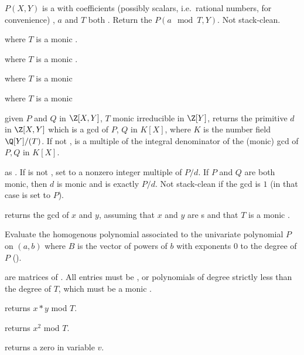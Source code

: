  $P(X,Y)$ is a  with
 coefficients (possibly scalars, i.e.~rational numbers, for
convenience) , $a$ and $T$ both . Return the  $P(a \mod
T, Y)$. Not stack-clean.


 where $T$ is a monic .

 where $T$ is a monic .

 where $T$ is a monic 

 where $T$ is a monic 

 given $P$ and $Q$ in
$\Z[X,Y]$, $T$ monic irreducible in $\Z[Y]$, returns the primitive $d$ in
$\Z[X,Y]$ which is a gcd of $P$, $Q$ in $K[X]$, where $K$ is the number field
$\Q[Y]/(T)$. If not ,  is a multiple of the integral
denominator of the (monic) gcd of $P,Q$ in $K[X]$.

 as .
If  is not , set  to a nonzero integer
multiple of $P/d$. If $P$ and $Q$ are both monic, then $d$ is monic and
 is exactly $P/d$. Not stack-clean if the gcd is $1$
(in that case  is set to $P$).

 returns the gcd of $x$ and $y$,
assuming that $x$ and $y$ are s and that $T$ is a monic .

Evaluate the homogenous polynomial associated to the univariate polynomial
$P$ on $(a,b)$ where $B$ is the vector of powers of $b$ with exponents
$0$ to the degree of $P$ ().


 are matrices of . All entries must be ,  or
polynomials of degree strictly less than the degree of $T$, which must be a monic
.

 returns $x*y$ mod $T$.

 returns $x^2$ mod $T$.


 returns a zero  in variable $v$.

